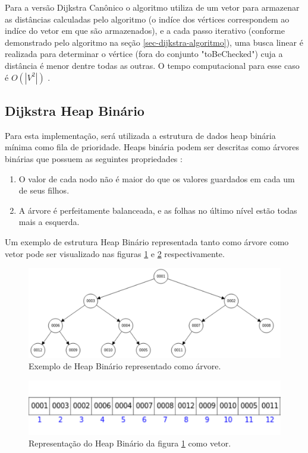 Para a versão Dijkstra Canônico o algoritmo utiliza de um vetor para armazenar as distâncias calculadas pelo algoritmo (o indíce dos vértices correspondem ao indíce do vetor em que são armazenados), e a cada passo iterativo (conforme demonstrado pelo algoritmo na seção \ref{sec-dijkstra-algoritmo}), uma busca linear é realizada para determinar o vértice (fora do conjunto "toBeChecked") cuja a distância é menor dentre todas as outras. O tempo computacional para esse caso é $O(|V^{2}|)$ \cite{drozdek2012data}.

\subsection{Dijkstra Heap Binário}
\label{sec-dijkstra-versoes-heap}
Para esta implementação, será utilizada a estrutura de dados heap binária mínima como fila de prioridade. Heaps binária podem ser descritas como árvores binárias que possuem as seguintes propriedades \cite{drozdek2012data}:
\begin{enumerate}
 \item O valor de cada nodo não é maior do que os valores guardados em cada um de seus filhos.
 \item A árvore é perfeitamente balanceada, e as folhas no último nível estão todas mais a esquerda.
\end{enumerate}

Um exemplo de estrutura Heap Binário representada tanto como árvore como vetor pode ser visualizado nas figuras \ref{fig-dijkstra-heapbinario} e \ref{fig-dijkstra-heapvetor} respectivamente.

\begin{figure}[H]
\centering
\includegraphics[width=.95\textwidth]{figuras/Heap} 
\caption{Exemplo de Heap Binário representado como árvore.}
\label{fig-dijkstra-heapbinario}
\end{figure}

\begin{figure}[H]
\centering
\includegraphics[width=.60\textwidth]{figuras/Heap-vetor}
\caption{Representação do Heap Binário da figura \ref{fig-dijkstra-heapbinario} como vetor.}
\label{fig-dijkstra-heapvetor}
\end{figure}

